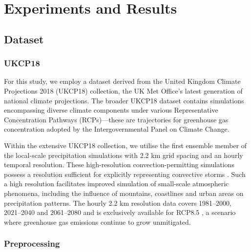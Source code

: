 \documentclass[ oneside,%
                    author={George Herbert},
                    degree={MSci},
                     title={Diffusion Models for Time-Evolving Precipitation Fields},
                  subtitle={}]{dissertation}
\begin{document}

\chapter{Experiments and Results}
\label{chap:results}

\section{Dataset}
\label{sec:results_dataset}

\subsection{UKCP18}
\label{sec:results_dataset_ukcp18}

For this study, we employ a dataset derived from the United Kingdom Climate Projections 2018 (UKCP18) \cite{MO_UKCP18_Dataset} collection, the UK Met Office's latest generation of national climate projections. The broader UKCP18 dataset contains simulations encompassing diverse climate components under various Representative Concentration Pathways (RCPs)---these are trajectories for greenhouse gas concentration adopted by the Intergovernmental Panel on Climate Change.

Within the extensive UKCP18 collection, we utilise the first ensemble member of the local-scale precipitation simulations with 2.2 km grid spacing and an hourly temporal resolution. These high-resolution convection-permitting simulations possess a resolution sufficient for explicitly representing convective storms \cite{MO_CPM}. Such a high resolution facilitates improved simulation of small-scale atmospheric phenomena, including the influence of mountains, coastlines and urban areas on precipitation patterns. The hourly 2.2 km resolution data covers 1981--2000, 2021--2040 and 2061--2080 and is exclusively available for RCP8.5 \cite{MO_RCP_Guidance}, a scenario where greenhouse gas emissions continue to grow unmitigated.

\subsection{Preprocessing}
\end{document}
